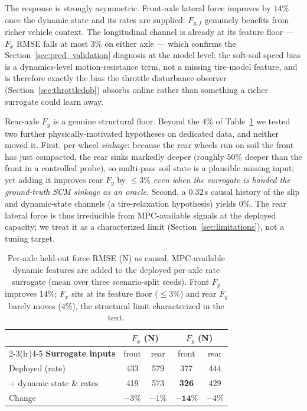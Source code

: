 \documentclass[conference,letterpaper,10pt]{IEEEtran}
\begin{document}
The response is strongly asymmetric. Front-axle lateral force improves by
$14\%$ once the dynamic state and its rates are supplied: $F_{y,f}$
genuinely benefits from richer vehicle context. The longitudinal channel
is already at its feature floor --- $F_x$ RMSE falls at most $3\%$ on
either axle --- which
confirms the Section~\ref{sec:pred_validation} diagnosis at the model
level: the soft-soil speed bias is a dynamics-level motion-resistance
term, not a missing tire-model feature, and is therefore exactly the
bias the throttle disturbance observer
(Section~\ref{sec:throttledob}) absorbs online rather than something a
richer surrogate could learn away.

Rear-axle $F_y$ is a genuine structural floor. Beyond the $4\%$ of
Table~\ref{tab:feature_headroom} we tested two further
physically-motivated hypotheses on dedicated data, and neither moved it.
First, per-wheel \emph{sinkage}: because the rear wheels run on soil the
front has just compacted, the rear sinks markedly deeper (roughly $50\%$
deeper than the front in a controlled probe), so multi-pass soil state
is a plausible missing input; yet adding it improves rear $F_y$ by
$\le 3\%$ \emph{even when the surrogate is handed the ground-truth SCM
sinkage as an oracle}. Second, a $0.32$\,s causal history of the slip
and dynamic-state channels (a tire-relaxation hypothesis) yields $0\%$.
The rear lateral force is thus irreducible from MPC-available signals at
the deployed capacity; we treat it as a characterized limit
(Section~\ref{sec:limitations}), not a tuning target.

\begin{table}[!t]
  \renewcommand{\arraystretch}{1.15}
  \caption{Per-axle held-out force RMSE (N) as causal, MPC-available
    dynamic features are added to the deployed per-axle rate surrogate
    (mean over three scenario-split seeds). Front $F_y$ improves $14\%$;
    $F_x$ sits at its feature floor ($\le 3\%$) and rear $F_y$ barely moves
    ($4\%$), the structural limit characterized in the text.}
  \label{tab:feature_headroom}
  \centering
  \setlength{\tabcolsep}{5pt}
  \begin{tabular}{lcccc}
    \toprule
    & \multicolumn{2}{c}{\textbf{$F_x$ (N)}} & \multicolumn{2}{c}{\textbf{$F_y$ (N)}}\\
    \cmidrule(lr){2-3}\cmidrule(lr){4-5}
    \textbf{Surrogate inputs} & front & rear & front & rear\\
    \midrule
    Deployed (rate)            & 433 & 579 & 377 & 444\\
    {}\;+ dynamic state \& rates & 419 & 573 & \textbf{326} & 429\\
    \midrule
    Change                     & $-3\%$ & $-1\%$ & $\mathbf{-14\%}$ & $-4\%$\\
    \bottomrule
  \end{tabular}
\end{table}
\end{document}
